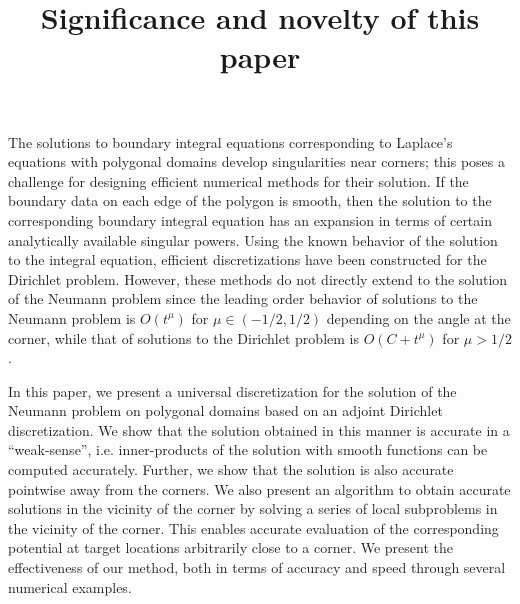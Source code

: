 \documentclass[12pt,times]{elsarticle}
\begin{document}
 \title{Significance and novelty of this paper}
 \maketitle
The solutions to boundary integral equations corresponding to Laplace's equations
with polygonal domains
develop singularities near corners; this poses a challenge for designing
efficient numerical methods for their solution. 
If the boundary data on each edge of the polygon is smooth, then the solution
to the corresponding boundary integral equation has an expansion in terms of certain analytically
available singular powers. 
Using the known behavior of the solution to the integral equation, efficient
discretizations have been constructed for the Dirichlet problem.
However, these methods do not directly extend to the solution of the Neumann problem
since the leading order behavior of solutions to the Neumann problem is $O(t^{\mu})$ 
for $\mu \in (-1/2,1/2)$ depending on the angle at the corner, while that of solutions
to the Dirichlet problem is $O(C + t^{\mu})$ for $\mu>1/2$. 

In this paper, we present a universal discretization for the solution of the Neumann problem
on polygonal domains based on an adjoint Dirichlet discretization.
We show that the solution obtained in this manner is accurate in a ``weak-sense'', i.e. 
inner-products of the solution with smooth functions can be computed accurately. 
Further, we show that the solution is also accurate pointwise away from the corners. 
We also present an algorithm to obtain accurate solutions in the vicinity of the corner
by solving a series of local subproblems in the vicinity of the corner. 
This enables accurate evaluation of the corresponding potential at target locations arbitrarily
close to a corner. We present the effectiveness of our method, both in terms of accuracy
and speed through several numerical examples.
\end{document}
